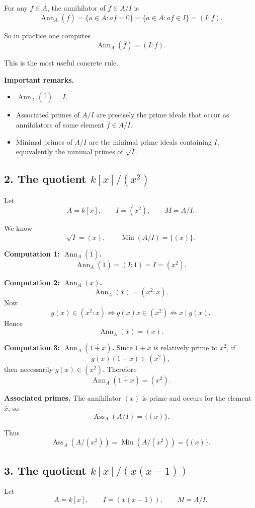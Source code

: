 \documentclass[12pt,a4paper]{article}
\theoremstyle{notespace}
\DeclareMathOperator{\Ass}{Ass}
\DeclareMathOperator{\Ann}{Ann}
\DeclareMathOperator{\Min}{Min}
\begin{document}
For any \(f\in A\), the annihilator of \(\overline f\in A/I\) is
\[
\Ann_A(\overline f)=\{a\in A:a\overline f=0\}
=\{a\in A:af\in I\}
=(I:f).
\]

So in practice one computes
\[
\Ann_A(\overline f)=(I:f).
\]

This is the most useful concrete rule.

\medskip

\textbf{Important remarks.}
\begin{itemize}
	\item \(\Ann_A(\overline 1)=I\).
	\item Associated primes of \(A/I\) are precisely the prime ideals that occur as annihilators of some element \(\overline f\in A/I\).
	\item Minimal primes of \(A/I\) are the minimal prime ideals containing \(I\), equivalently the minimal primes of \(\sqrt I\).
\end{itemize}

\subsection*{2. The quotient \(k[x]/(x^2)\)}

Let
\[
A=k[x],\qquad I=(x^2),\qquad M=A/I.
\]

We know
\[
\sqrt I=(x),
\qquad
\Min(A/I)=\{(x)\}.
\]

\textbf{Computation 1: \(\Ann_A(\overline 1)\).}
\[
\Ann_A(\overline 1)=(I:1)=I=(x^2).
\]

\textbf{Computation 2: \(\Ann_A(\overline x)\).}
\[
\Ann_A(\overline x)=(x^2:x).
\]
Now
\[
g(x)\in (x^2:x)
\iff g(x)x\in (x^2)
\iff x\mid g(x).
\]
Hence
\[
\Ann_A(\overline x)=(x).
\]

\textbf{Computation 3: \(\Ann_A(\overline{1+x})\).}
Since \(1+x\) is relatively prime to \(x^2\), if
\[
g(x)(1+x)\in (x^2),
\]
then necessarily \(g(x)\in (x^2)\). Therefore
\[
\Ann_A(\overline{1+x})=(x^2).
\]

\textbf{Associated primes.}
The annihilator \((x)\) is prime and occurs for the element \(\overline x\), so
\[
\Ass_A(A/I)=\{(x)\}.
\]

Thus
\[
\Ass_A(A/(x^2))=\Min(A/(x^2))=\{(x)\}.
\]

\subsection*{3. The quotient \(k[x]/(x(x-1))\)}

Let
\[
A=k[x],\qquad I=(x(x-1)),\qquad M=A/I.
\]
\end{document}
